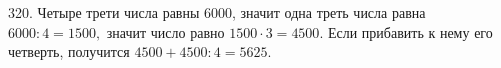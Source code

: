 320. Четыре трети числа равны 6000, значит одна треть числа равна $6000:4=1500,$ значит число равно $1500\cdot3=4500.$ Если прибавить к нему его четверть, получится $4500+4500:4=5625.$\\
